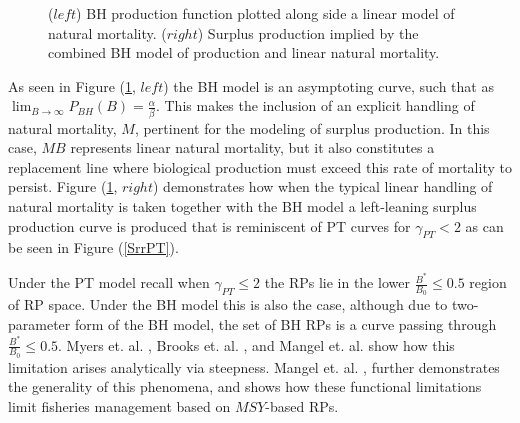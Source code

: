 \begin{figure}[h!]
\begin{minipage}[h!]{0.49\textwidth}
\end{minipage}
\caption{\label{srrBH}
	($left$) BH production function plotted along side a linear model of natural mortality.
	($right$) Surplus production implied by the combined BH model of production and linear natural mortality.
}
\end{figure}

%
As seen in Figure (\ref{srrBH}, $left$) the BH model is an asymptoting curve, 
such that as $\lim_{B\to\infty}P_{BH}(B)=\frac{\alpha}{\beta}$. This makes the 
inclusion of an explicit handling of natural mortality, $M$, pertinent for 
the modeling of surplus production. In this case, $MB$ represents linear natural 
mortality, but it also constitutes a replacement line where biological production 
must exceed this rate of mortality to persist. Figure (\ref{srrBH}, $right$) 
demonstrates how when the typical linear handling of natural mortality is 
taken together with the BH model a left-leaning surplus production curve is 
produced that is reminiscent of PT curves for $\gamma_{PT}<2$ as can be seen in 
Figure (\ref{SrrPT}).
  

%
Under the PT model recall when $\gamma_{PT}\le2$ the RPs lie in the lower 
$\frac{B^*}{B_0}\le0.5$ region of RP space. Under the BH model this is also the 
case, although due to two-parameter form of the BH model, the set of BH RPs is a 
curve passing through $\frac{B^*}{B_0}\le0.5$. Myers et. al. \cite{myers_maximum_1999}, 
Brooks et. al. \cite{brooks_analytical_2010}, and Mangel et. al. \cite{mangel_perspective_2013} 
show how this limitation arises analytically via steepness. Mangel et. al. \cite{mangel_perspective_2013}, 
further demonstrates the generality of this phenomena, and shows how these 
functional limitations limit fisheries management based on $MSY$-based RPs. 

